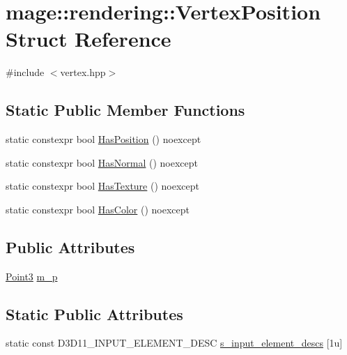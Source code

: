 \hypertarget{structmage_1_1rendering_1_1_vertex_position}{}\section{mage\+:\+:rendering\+:\+:Vertex\+Position Struct Reference}
\label{structmage_1_1rendering_1_1_vertex_position}


{\ttfamily \#include $<$vertex.\+hpp$>$}

\subsection*{Static Public Member Functions}
\begin{DoxyCompactItemize}
\item 
static constexpr bool \mbox{\hyperlink{structmage_1_1rendering_1_1_vertex_position_a23134a6f43a36f72f94ec6dba3024503}{Has\+Position}} () noexcept
\item 
static constexpr bool \mbox{\hyperlink{structmage_1_1rendering_1_1_vertex_position_abf33917c1c93dfcffd25c146b53189e8}{Has\+Normal}} () noexcept
\item 
static constexpr bool \mbox{\hyperlink{structmage_1_1rendering_1_1_vertex_position_aac518715cc922a0094261f075f8ae80b}{Has\+Texture}} () noexcept
\item 
static constexpr bool \mbox{\hyperlink{structmage_1_1rendering_1_1_vertex_position_afe87ed5fda84b4acc17a94a07d389ff7}{Has\+Color}} () noexcept
\end{DoxyCompactItemize}
\subsection*{Public Attributes}
\begin{DoxyCompactItemize}
\item 
\mbox{\hyperlink{structmage_1_1_point3}{Point3}} \mbox{\hyperlink{structmage_1_1rendering_1_1_vertex_position_a49602fa786c64fb0fca47a0a0992f779}{m\+\_\+p}}
\end{DoxyCompactItemize}
\subsection*{Static Public Attributes}
\begin{DoxyCompactItemize}
\item 
static const D3\+D11\+\_\+\+I\+N\+P\+U\+T\+\_\+\+E\+L\+E\+M\+E\+N\+T\+\_\+\+D\+E\+SC \mbox{\hyperlink{structmage_1_1rendering_1_1_vertex_position_a669150e1acd6ed132eec465745ddb201}{s\+\_\+input\+\_\+element\+\_\+descs}} \mbox{[}1u\mbox{]}
\end{DoxyCompactItemize}


